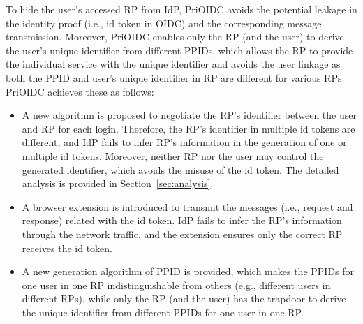 

To hide the user's accessed RP from IdP, PriOIDC avoids the potential leakage in the identity proof (i.e., id token in OIDC)  and the corresponding message transmission. Moreover, PriOIDC enables only the RP (and the user) to derive the user's unique identifier from different PPIDs,  which  allows the RP to provide the individual service with the unique identifier and avoids the user linkage as both the PPID and user's unique identifier in RP are different for various RPs. PriOIDC achieves these as follows: 
\begin{itemize}
\item A new algorithm is proposed to negotiate the RP's identifier between the user and RP for each login. Therefore, the RP's identifier in multiple id tokens are different, and IdP fails to infer RP's information in the generation of one or multiple id tokens. Moreover, neither RP nor the user may control the generated identifier, which avoids the misuse of the id token. The detailed analysis is provided  in Section~\ref{sec:analysis}.
\item A browser extension is introduced to transmit the messages (i.e.,  request and response) related with the id token. IdP fails to infer the RP's information through the network traffic, and the extension ensures only the correct RP receives the id token.
\item A new generation algorithm of PPID is provided, which makes the PPIDs for one user in one RP  indistinguishable  from others (e.g., different users in different RPs), while only the RP (and the user) has the trapdoor to derive the unique identifier from different PPIDs for one user in one RP.
\end{itemize}

